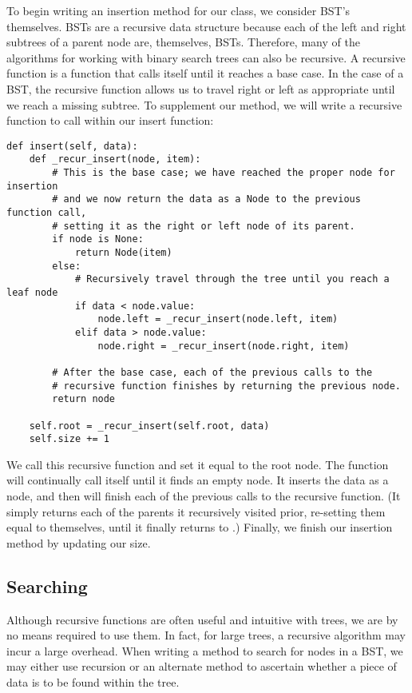 To begin writing an insertion method for our  class, we consider BST's themselves.
BSTs are a recursive data structure because each of the left and right subtrees of a parent node are, themselves, BSTs.
Therefore, many of the algorithms for working with binary search trees can also be recursive.
A recursive function is a function that calls itself until it reaches a base case. 
In the case of a BST, the recursive function allows us to travel right or left as appropriate until we reach a missing subtree.
To supplement our  method, we will write a recursive function to call within our insert function:
\begin{lstlisting}
def insert(self, data):
    def _recur_insert(node, item):
        # This is the base case; we have reached the proper node for insertion
        # and we now return the data as a Node to the previous function call,
        # setting it as the right or left node of its parent.
        if node is None:
            return Node(item)
        else:
            # Recursively travel through the tree until you reach a leaf node
            if data < node.value:
                node.left = _recur_insert(node.left, item)
            elif data > node.value:
                node.right = _recur_insert(node.right, item)
                
        # After the base case, each of the previous calls to the
        # recursive function finishes by returning the previous node.
        return node
        
    self.root = _recur_insert(self.root, data)
    self.size += 1
\end{lstlisting}
We call this recursive function and set it equal to the root node.
The function will continually call itself until it finds an empty node. 
It inserts the data as a node, and then  will finish each of the previous calls to the recursive function. 
(It simply returns each of the parents it recursively visited prior, re-setting them equal to themselves, until it finally returns to .)
Finally, we finish our insertion method by updating our size.

\subsection*{Searching}
Although recursive functions are often useful and intuitive with trees, we are by no means required to use them.
In fact, for large trees, a recursive algorithm may incur a large overhead.
When writing a method to search for nodes in a BST, we may either use recursion or an alternate method to ascertain whether a piece of data is to be found within the tree.


